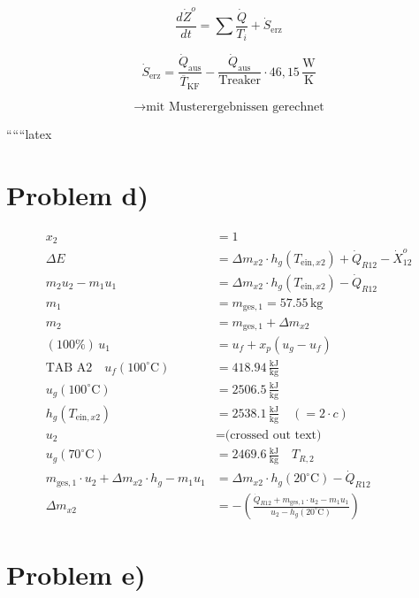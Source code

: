 \[
\frac{d\dot{Z}^o}{dt} = \sum \frac{\dot{Q}}{T_i} + \dot{S}_{\text{erz}}
\]

\[
\dot{S}_{\text{erz}} = \frac{\dot{Q}_{\text{aus}}}{\overline{T}_{\text{KF}}} - \frac{\dot{Q}_{\text{aus}}}{\text{Treaker}} \cdot 46,15 \, \frac{\text{W}}{\text{K}}
\]

\[
\rightarrow \text{mit Musterergebnissen gerechnet}
\]

``````latex


\section*{Problem d)}

\begin{align*}
    x_2 &= 1 \\
    \Delta E &= \Delta m_{x2} \cdot h_g(T_{\text{ein}, x2}) + \dot{Q}_{R12} - \dot{X}_{12}^o \\
    m_2 u_2 - m_1 u_1 &= \Delta m_{x2} \cdot h_g(T_{\text{ein}, x2}) - \dot{Q}_{R12} \\
    m_1 &= m_{\text{ges}, 1} = 57.55 \, \text{kg} \\
    m_2 &= m_{\text{ges}, 1} + \Delta m_{x2} \\
    (100\%) \, u_1 &= u_f + x_p (u_g - u_f) \\
    \text{TAB A2} \quad u_f(100^\circ \text{C}) &= 418.94 \, \frac{\text{kJ}}{\text{kg}} \\
    u_g(100^\circ \text{C}) &= 2506.5 \, \frac{\text{kJ}}{\text{kg}} \\
    h_g(T_{\text{ein}, x2}) &= 2538.1 \, \frac{\text{kJ}}{\text{kg}} \quad (= 2 \cdot c) \\
    u_2 &= \text{(crossed out text)} \\
    u_g(70^\circ \text{C}) &= 2469.6 \, \frac{\text{kJ}}{\text{kg}} \quad T_{R,2} \\
    m_{\text{ges}, 1} \cdot u_2 + \Delta m_{x2} \cdot h_g - m_1 u_1 &= \Delta m_{x2} \cdot h_g(20^\circ \text{C}) - \dot{Q}_{R12} \\
    \Delta m_{x2} &= -\left( \frac{\dot{Q}_{R12} + m_{\text{ges}, 1} \cdot u_2 - m_1 u_1}{u_2 - h_g(20^\circ \text{C})} \right)
\end{align*}

\section*{Problem e)}

